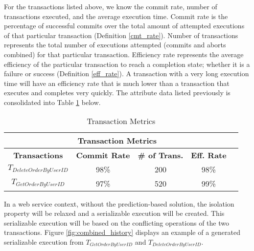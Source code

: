 For the transactions listed above, we know the commit rate, number of transactions executed, and the average execution time. Commit rate is the percentage of successful commits over the total amount of attempted executions of that particular transaction (Definition \ref{cmt_rate}). Number of transactions represents the total number of executions attempted (commits and aborts combined) for that particular transaction. Efficiency rate represents the average efficiency of the particular transaction to reach a completion state; whether it is a failure or success (Definition \ref{eff_rate}). A transaction with a very long execution time will have an efficiency rate that is much lower than a transaction that executes and completes very quickly. The attribute data listed previously is consolidated into Table \ref{tbl:trans_metrics} below. 
\\
\begin{table}[h]
\captionsetup{justification=centering}
\centering
\begin{tabular}{|c|c|c|c|c|}
\hline
\multicolumn{4}{|c|}{\cellcolor[HTML]{EFEFEF}\textbf{Transaction Metrics}}                                                   \\ \hline
\textbf{Transactions} & \textbf{Commit Rate} & \textbf{\# of Trans.} & {\color[HTML]{000000} \textbf{Eff. Rate}} \\ \hline
$T_{DeleteOrderByUserID}$         & 98\%                  & 200                         & 98\%                                          \\ \hline
$T_{GetOrderByUserID}$          & 97\%                     & 520                           & 99\%                                              \\ \hline
\end{tabular}

\caption{Transaction Metrics} %
\label{tbl:trans_metrics} %

\end{table}

In a web service context, without the prediction-based solution, the isolation property will be relaxed and a serializable execution will be created. This serializable execution will be based on the conflicting operations of the two transactions. Figure \ref{fig:combined_history} displays an example of a generated serializable execution from $T_{GetOrderByUserID}$ and $T_{DeleteOrderByUserID}$.

